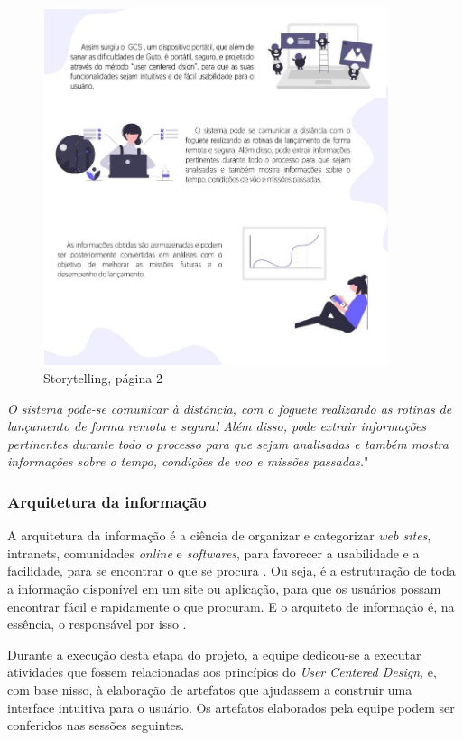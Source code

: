 \begin{figure}[H]
\centering
\includegraphics[width=0.9\textwidth]{figuras/sotytelling2.jpg}
\caption{Storytelling, página 2}
\label{fig:sistema de alimentacao}
\end{figure}

\textit{O sistema pode-se comunicar à distância, com o foguete realizando as rotinas de lançamento de forma remota e segura! Além disso, pode extrair informações pertinentes durante todo o processo para que sejam analisadas e também mostra informações sobre o tempo, condições de voo e missões passadas.}"

\subsubsection{Arquitetura da informação}

A arquitetura da informação é a ciência de organizar e categorizar \textit{web sites}, intranets, comunidades \textit{online} e \textit{softwares}, para favorecer a usabilidade e a facilidade, para se encontrar o que se procura \cite{de2011fundamentos}. Ou seja, é a estruturação de toda a informação disponível em um site ou aplicação, para que os usuários possam encontrar fácil e rapidamente o que procuram. E o arquiteto de informação é, na essência, o responsável por isso \cite{de2011fundamentos}. 

Durante a execução desta etapa do projeto, a equipe dedicou-se a executar atividades que fossem relacionadas aos princípios do \textit{User Centered Design}, e, com base nisso, à elaboração de artefatos que ajudassem a construir uma interface intuitiva para o usuário. Os artefatos elaborados pela equipe podem ser conferidos nas sessões seguintes.

